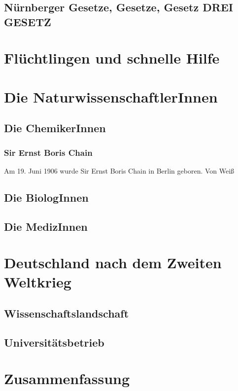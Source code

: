 \documentclass[11pt]{article}
\begin{document}
\subsection{N\"urnberger Gesetze, Gesetze, Gesetz DREI GESETZ}

\newpage
\section{Fl\"uchtlingen und schnelle Hilfe}

\newpage
\section{Die NaturwissenschaftlerInnen}
\subsection{Die ChemikerInnen}

\subsubsection{Sir Ernst Boris Chain}
Am 19. Juni 1906 wurde Sir Ernst Boris Chain in Berlin geboren. Von Wei\ss 

\subsection{Die BiologInnen}
\subsection{Die MedizInnen}

\newpage
\section{Deutschland nach dem Zweiten Weltkrieg}
\subsection{Wissenschaftslandschaft}
\subsection{Universit\"atsbetrieb}

\newpage
\section{Zusammenfassung}
\end{document}
